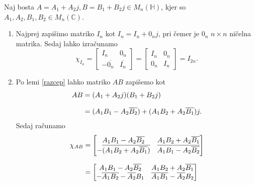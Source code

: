 \documentclass[mat1, tisk]{fmfdelo}
\numberwithin{equation}{section}
\begin{document}
\begin{dokaz}
    Naj bosta $A = A_{1} + A_{2}j, B = B_{1} + B_{2}j\in M_{n}(\mathbb{H})$, kjer so $A_{1}, A_{2}, B_{1}, B_{2} \in M_{n}(\mathbb{C})$.
    \begin{enumerate}
        \item Najprej zapišimo matriko $I_{n}$ kot
        $I_{n} = I_{n} + 0_{n}j$,
        pri čemer je $0_{n}$ $n \times n$ ničelna matrika. Sedaj lahko izračunamo
        $$\chi_{I_{n}} =
        \begin{bmatrix}
            I_{n} & 0_{n}\\
            -\overline{0_{n}} & \overline{I_{n}}
        \end{bmatrix}
        =
        \begin{bmatrix}
            I_{n} & 0_{n} \\
            0_{n} & I_{n}
        \end{bmatrix} 
        =I_{2n}.$$
        \item Po lemi \ref{razcep} lahko matriko $AB$ zapišemo kot
        \begin{equation*}
            \setlength{\jot}{10pt}
                \begin{aligned}
                    AB &= (A_{1} + A_{2}j)(B_{1} + B_{2}j) \\
                    &= (A_{1}B_{1} - A_{2}\overline{B_{2}})+(A_{1}B_{2} + A_{2}\overline{B_{1}})j.
                \end{aligned}  
        \end{equation*}
        Sedaj računamo 
        \begin{equation*}
            \setlength{\jot}{10pt}
                \begin{aligned}
                    \chi_{AB} &= 
                    \begin{bmatrix}
                        A_{1}B_{1} - A_{2}\overline{B_{2}} & A_{1}B_{2} + A_{2}\overline{B_{1}} \\
                        - \overline{(A_{1}B_{2} + A_{2}\overline{B_{1}})} & \overline{A_{1}B_{1} - A_{2}\overline{B_{2}}}
                    \end{bmatrix} \\
                    &=
                    \begin{bmatrix}
                        A_{1}B_{1} - A_{2}\overline{B_{2}} & A_{1}B_{2} + A_{2}\overline{B_{1}} \\
                        - \overline{A_{1}B_{2}} - \overline{A_{2}}B_{1} & \overline{A_{1}B_{1}} - \overline{A_{2}}B_{2}

\end{bmatrix}
\end{aligned}
\end{equation*}
\end{enumerate}
\end{dokaz}
\end{document}
